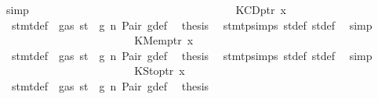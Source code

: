 \begin{isabellebody}
\ simp\isanewline
\ \ \ \ \ \ \ \ \ \ \ \ \isamarkupfalse%
\isanewline
\ \ \ \ \ \ \ \ \ \ \isamarkupfalse%
\isanewline
\ \ \ \ \ \ \ \ \ \ \ \ \isamarkupfalse%
\ {\isacharparenleft}{\kern0pt}KCDptr\ x{}{\isacharparenright}{\kern0pt}\isanewline
\ \ \ \ \ \ \ \ \ \ \ \ \isamarkupfalse%
\ {}{\isacharparenleft}{\kern0pt}{}{\isacharparenright}{\kern0pt}\ stmt{\isacharunderscore}{\kern0pt}def\ {\isacharbackquoteopen}{\isasymnot}\ gas\ st\ {\isasymle}\ g{\isacharbackquoteclose}\ n\ Pair\ g{\isacharunderscore}{\kern0pt}def\ \isamarkupfalse%
\ {\isacharquery}{\kern0pt}thesis\ \isamarkupfalse%
\ stmt{\isachardot}{\kern0pt}psimps{\isacharparenleft}{\kern0pt}{}{\isacharparenright}{\kern0pt}\ st{\isacharprime}{\kern0pt}{\isacharunderscore}{\kern0pt}def\ st{\isacharprime}{\kern0pt}{\isacharprime}{\kern0pt}{\isacharunderscore}{\kern0pt}def\ \isamarkupfalse%
\ simp\isanewline
\ \ \ \ \ \ \ \ \ \ \isamarkupfalse%
\isanewline
\ \ \ \ \ \ \ \ \ \ \ \ \isamarkupfalse%
\ {\isacharparenleft}{\kern0pt}KMemptr\ x{}{\isacharparenright}{\kern0pt}\isanewline
\ \ \ \ \ \ \ \ \ \ \ \ \isamarkupfalse%
\ {}{\isacharparenleft}{\kern0pt}{}{\isacharparenright}{\kern0pt}\ stmt{\isacharunderscore}{\kern0pt}def\ {\isacharbackquoteopen}{\isasymnot}\ gas\ st\ {\isasymle}\ g{\isacharbackquoteclose}\ n\ Pair\ g{\isacharunderscore}{\kern0pt}def\ \isamarkupfalse%
\ {\isacharquery}{\kern0pt}thesis\ \isamarkupfalse%
\ stmt{\isachardot}{\kern0pt}psimps{\isacharparenleft}{\kern0pt}{}{\isacharparenright}{\kern0pt}\ st{\isacharprime}{\kern0pt}{\isacharunderscore}{\kern0pt}def\ st{\isacharprime}{\kern0pt}{\isacharprime}{\kern0pt}{\isacharunderscore}{\kern0pt}def\ \isamarkupfalse%
\ simp\isanewline
\ \ \ \ \ \ \ \ \ \ \isamarkupfalse%
\isanewline
\ \ \ \ \ \ \ \ \ \ \ \ \isamarkupfalse%
\ {\isacharparenleft}{\kern0pt}KStoptr\ x{}{\isacharparenright}{\kern0pt}\isanewline
\ \ \ \ \ \ \ \ \ \ \ \ \isamarkupfalse%
\ {}{\isacharparenleft}{\kern0pt}{}{\isacharparenright}{\kern0pt}\ stmt{\isacharunderscore}{\kern0pt}def\ {\isacharbackquoteopen}{\isasymnot}\ gas\ st\ {\isasymle}\ g{\isacharbackquoteclose}\ n\ Pair\ g{\isacharunderscore}{\kern0pt}def\ \isamarkupfalse%
\ {\isacharquery}{\kern0pt}thesis\ \isamarkupfalse%

\end{isabellebody}
